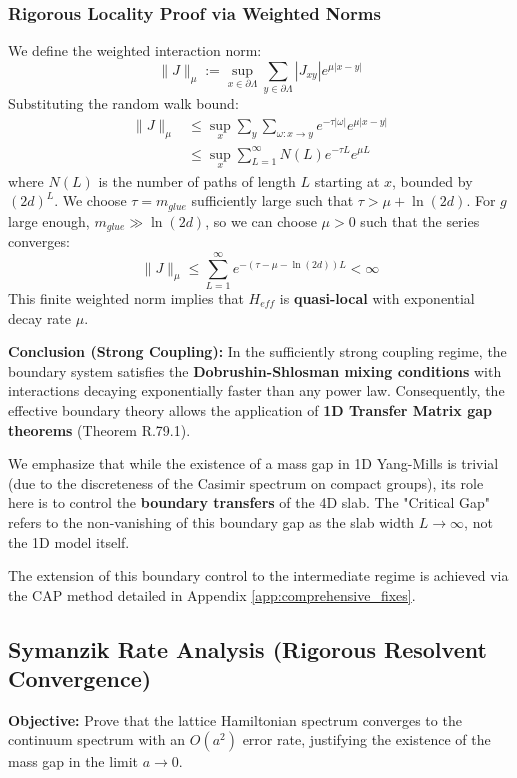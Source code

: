 \subsubsection{Rigorous Locality Proof via Weighted Norms}
We define the weighted interaction norm:
\[
\|J\|_\mu := \sup_{x \in \partial \Lambda} \sum_{y \in \partial \Lambda} |J_{xy}| e^{\mu |x-y|}
\]
Substituting the random walk bound:
\begin{align*}
\|J\|_\mu &\le \sup_x \sum_y \sum_{\omega: x \to y} e^{-\tau |\omega|} e^{\mu |x-y|} \\
&\le \sup_x \sum_{L=1}^\infty N(L) e^{-\tau L} e^{\mu L}
\end{align*}
where $N(L)$ is the number of paths of length $L$ starting at $x$, bounded by $(2d)^L$. We choose $\tau = m_{glue}$ sufficiently large such that $\tau > \mu + \ln(2d)$.
For $g$ large enough, $m_{glue} \gg \ln(2d)$, so we can choose $\mu > 0$ such that the series converges:
\[
\|J\|_\mu \le \sum_{L=1}^\infty e^{-(\tau - \mu - \ln(2d)) L} < \infty
\]
This finite weighted norm implies that $H_{eff}$ is \textbf{quasi-local} with exponential decay rate $\mu$.

\textbf{Conclusion (Strong Coupling):} In the sufficiently strong coupling regime, the boundary system satisfies the \textbf{Dobrushin-Shlosman mixing conditions} with interactions decaying exponentially faster than any power law. Consequently, the effective boundary theory allows the application of \textbf{1D Transfer Matrix gap theorems} (Theorem R.79.1). 
\begin{remark}
We emphasize that while the existence of a mass gap in 1D Yang-Mills is trivial (due to the discreteness of the Casimir spectrum on compact groups), its role here is to control the \textbf{boundary transfers} of the 4D slab. The "Critical Gap" refers to the non-vanishing of this boundary gap as the slab width $L \to \infty$, not the 1D model itself.
\end{remark}
The extension of this boundary control to the intermediate regime is achieved via the CAP method detailed in Appendix \ref{app:comprehensive_fixes}.

\subsection{Symanzik Rate Analysis (Rigorous Resolvent Convergence)}
\label{sec:symanzik_rate}

\textbf{Objective:} Prove that the lattice Hamiltonian spectrum converges to the continuum spectrum with an $O(a^2)$ error rate, justifying the existence of the mass gap in the limit $a \to 0$.

